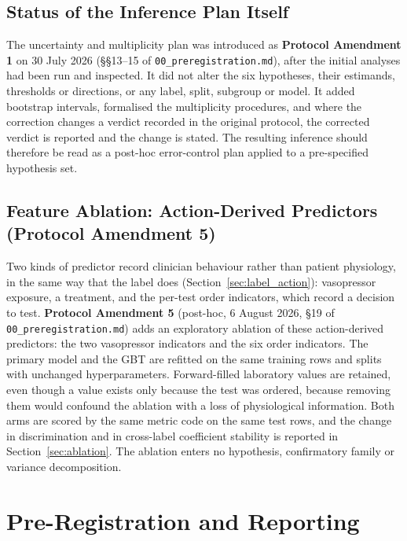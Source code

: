 \subsection{Status of the Inference Plan Itself}
\label{sec:inference_status}

The uncertainty and multiplicity plan was introduced as \textbf{Protocol
Amendment 1} on 30 July 2026 (\S\S13--15 of \texttt{00\_preregistration.md}),
after the initial analyses had been run and inspected. It did not alter the six
hypotheses, their estimands, thresholds or directions, or any label, split,
subgroup or model. It added bootstrap intervals, formalised the multiplicity
procedures, and where the correction changes a verdict recorded in the
original protocol, the corrected verdict is reported and the change is stated.
The resulting inference should therefore be read as a post-hoc error-control
plan applied to a pre-specified hypothesis set.

\subsection{Feature Ablation: Action-Derived Predictors (Protocol Amendment 5)}
\label{sec:ablation_method}

Two kinds of predictor record clinician behaviour rather than patient
physiology, in the same way that the label does
(Section~\ref{sec:label_action}): vasopressor exposure, a treatment, and the
per-test order indicators, which record a decision to test.
\textbf{Protocol Amendment 5} (post-hoc, 6 August 2026, \S19 of
\texttt{00\_preregistration.md}) adds an exploratory ablation of these
\pcAblNDropped{} action-derived predictors: the two vasopressor indicators and
the six order indicators. The primary model and the GBT are refitted on the
same training rows and splits with unchanged hyperparameters. Forward-filled
laboratory values are retained, even though a value exists only because the
test was ordered, because removing them would confound the ablation with a
loss of physiological information. Both arms are scored by the same metric
code on the same test rows, and the change in discrimination and in cross-label
coefficient stability is reported in Section~\ref{sec:ablation}. The ablation
enters no hypothesis, confirmatory family or variance decomposition.


\section{Pre-Registration and Reporting}

